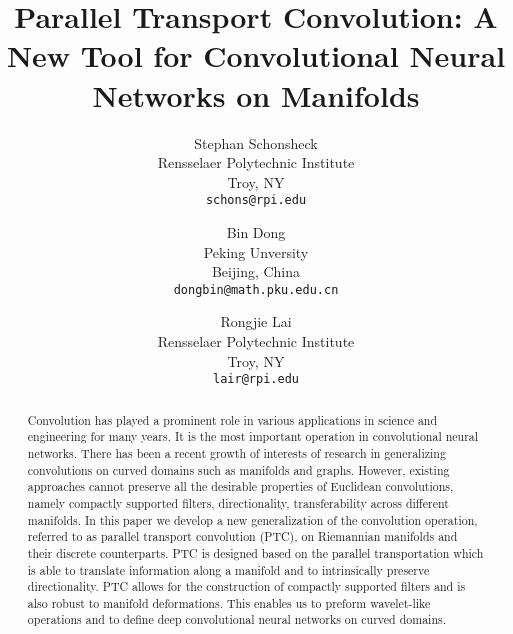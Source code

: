 \documentclass[10pt,twocolumn,letterpaper]{article}
\begin{document}
\date{}
\title{Parallel Transport Convolution: A New Tool for Convolutional Neural Networks on Manifolds}

\author{Stephan Schonsheck\\
Rensselaer Polytechnic Institute\\
Troy, NY\\
{\tt\small schons@rpi.edu}
\and
Bin Dong\\
Peking Unversity\\
Beijing, China\\
{\tt\small dongbin@math.pku.edu.cn}
\and
Rongjie Lai\\
Rensselaer Polytechnic Institute\\
Troy, NY\\
{\tt\small lair@rpi.edu}
}

\maketitle

\begin{abstract}
Convolution has played a prominent role in various applications in science and engineering for many years. It is the most important operation in convolutional neural networks. There has been a recent growth of interests of research in generalizing convolutions on curved domains such as manifolds and graphs. However, existing approaches cannot preserve all the desirable properties of Euclidean convolutions, namely compactly supported filters, directionality, transferability across different manifolds. In this paper we develop a new generalization of the convolution operation, referred to as parallel transport convolution (PTC), on Riemannian manifolds and their discrete counterparts. PTC is designed based on the parallel transportation which is able to translate information along a manifold and to intrinsically preserve directionality. PTC allows for the construction of compactly supported filters and is also robust to manifold deformations. This enables us to preform wavelet-like operations and to define deep convolutional neural networks on curved domains.
\end{abstract}
\end{document}
